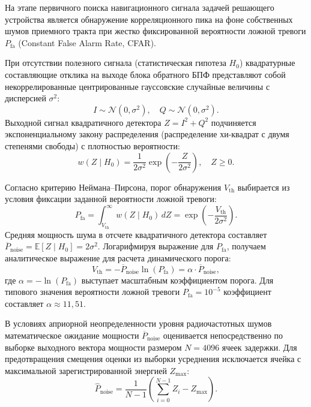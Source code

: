 На этапе первичного поиска навигационного сигнала задачей решающего устройства является обнаружение корреляционного пика на фоне собственных шумов приемного тракта при жестко фиксированной вероятности ложной тревоги $P_{\text{fa}}$ (Constant False Alarm Rate, CFAR). 

При отсутствии полезного сигнала (статистическая гипотеза $H_0$) квадратурные составляющие отклика на выходе блока обратного БПФ представляют собой некоррелированные центрированные гауссовские случайные величины с дисперсией $\sigma^2$:
\begin{equation}
I \sim \mathcal{N}(0, \sigma^2), \quad Q \sim \mathcal{N}(0, \sigma^2).
\end{equation}
Выходной сигнал квадратичного детектора $Z = I^2 + Q^2$ подчиняется экспоненциальному закону распределения (распределение хи-квадрат с двумя степенями свободы) с плотностью вероятности:
\begin{equation}
w(Z \mid H_0) = \frac{1}{2\sigma^2} \exp\left(-\frac{Z}{2\sigma^2}\right), \quad Z \ge 0.
\end{equation}

Согласно критерию Неймана--Пирсона, порог обнаружения $V_{\text{th}}$ выбирается из условия фиксации заданной вероятности ложной тревоги:
\begin{equation}
P_{\text{fa}} = \int_{V_{\text{th}}}^{\infty} w(Z \mid H_0) \, dZ = \exp\left(-\frac{V_{\text{th}}}{2\sigma^2}\right).
\end{equation}
Средняя мощность шума в отсчете квадратичного детектора составляет $\overline{P}_{\text{noise}} = \mathbb{E}[Z \mid H_0] = 2\sigma^2$. Логарифмируя выражение для $P_{\text{fa}}$, получаем аналитическое выражение для расчета динамического порога:
\begin{equation}
V_{\text{th}} = -\overline{P}_{\text{noise}} \ln(P_{\text{fa}}) = \alpha \cdot \overline{P}_{\text{noise}},
\end{equation}
где $\alpha = -\ln(P_{\text{fa}})$ выступает масштабным коэффициентом порога. Для типового значения вероятности ложной тревоги $P_{\text{fa}} = 10^{-5}$ коэффициент составляет $\alpha \approx 11{,}51$.

В условиях априорной неопределенности уровня радиочастотных шумов математическое ожидание мощности $\overline{P}_{\text{noise}}$ оценивается непосредственно по выборке выходного вектора мощности размером $N = 4096$ ячеек задержки. Для предотвращения смещения оценки из выборки усреднения исключается ячейка с максимальной зарегистрированной энергией $Z_{\max}$:
\begin{equation}
\widehat{P}_{\text{noise}} = \frac{1}{N - 1} \left( \sum_{i=0}^{N-1} Z_i - Z_{\max} \right).
\end{equation}

